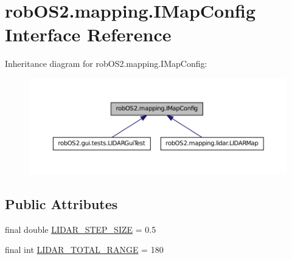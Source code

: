 \hypertarget{interfacerob_o_s2_1_1mapping_1_1_i_map_config}{
\section{robOS2.mapping.IMapConfig Interface Reference}
\label{interfacerob_o_s2_1_1mapping_1_1_i_map_config}
}


Inheritance diagram for robOS2.mapping.IMapConfig:\nopagebreak
\begin{figure}[H]
\begin{center}
\leavevmode
\includegraphics[width=400pt]{interfacerob_o_s2_1_1mapping_1_1_i_map_config__inherit__graph}
\end{center}
\end{figure}
\subsection*{Public Attributes}
\begin{DoxyCompactItemize}
\item 
final double \hyperlink{interfacerob_o_s2_1_1mapping_1_1_i_map_config_a37623bad1f37c915845c510b1d54a40b}{LIDAR\_\-STEP\_\-SIZE} = 0.5
\item 
final int \hyperlink{interfacerob_o_s2_1_1mapping_1_1_i_map_config_aac55d698a7eb94f9856a6ea5456bbfb0}{LIDAR\_\-TOTAL\_\-RANGE} = 180
\end{DoxyCompactItemize}


